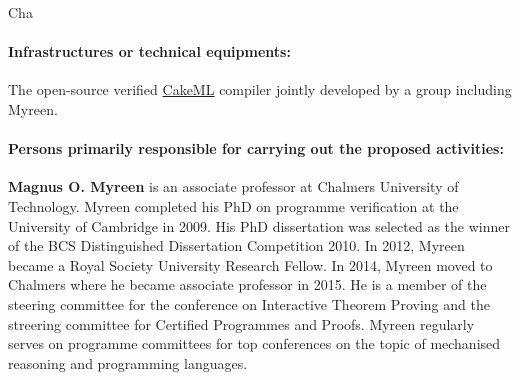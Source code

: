 \begin{sitedescription}{Cha}

\begin{compactitem}
\item 
\end{compactitem}

\paragraph*{Infrastructures or technical equipments:}


\begin{compactitem}
\item The open-source verified \href{https://cakeml.org/}{CakeML}
  compiler jointly developed by a group including Myreen.
\end{compactitem}

\paragraph*{Persons primarily responsible for carrying out the proposed activities:}

\begin{compactitem}
\item \textbf{Magnus O. Myreen} is an associate professor at Chalmers
  University of Technology.  Myreen completed his PhD on programme
  verification at the University of Cambridge in 2009. His PhD
  dissertation was selected as the winner of the BCS Distinguished
  Dissertation Competition 2010. In 2012, Myreen became a Royal
  Society University Research Fellow. In 2014, Myreen moved to
  Chalmers where he became associate professor in 2015.  He is a
  member of the steering committee for the conference on Interactive
  Theorem Proving and the streering committee for Certified Programmes
  and Proofs.  Myreen regularly serves on programme committees for top
  conferences on the topic of mechanised reasoning and programming
  languages.
\end{compactitem}

\end{sitedescription}

